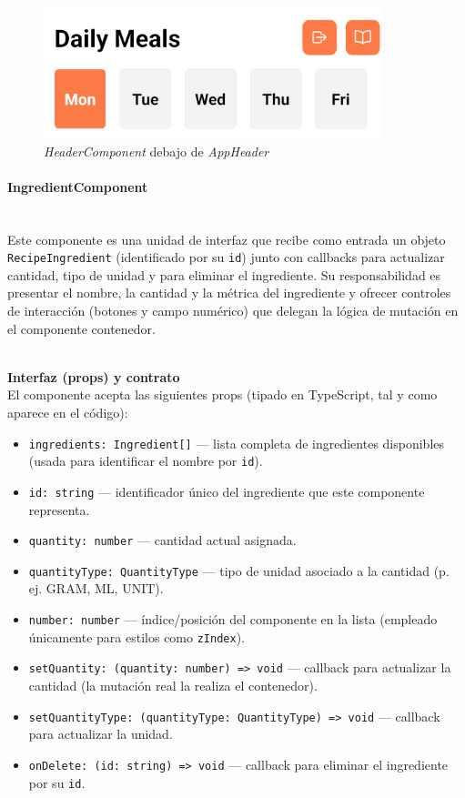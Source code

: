 \documentclass[twoside, openright, 11pt]{report}
\begin{document}
					\begin{figure}[H]
						\centering
						\includegraphics{imagenes/HeaderComponent}
						\caption{\textit{HeaderComponent} debajo de \textit{AppHeader}}
						\label{fig:HeaderComponent}
					\end{figure}
				
				
				\paragraph{IngredientComponent\\\\}
				\label{IngredientComponent}
				
				Este componente es una unidad de interfaz que recibe como entrada un objeto  \texttt{RecipeIngredient} (identificado por su \texttt{id}) junto con callbacks para actualizar cantidad, tipo de unidad y para eliminar el ingrediente. Su responsabilidad es presentar el nombre, la cantidad y la métrica del ingrediente y ofrecer controles de interacción (botones y campo numérico) que delegan la lógica de mutación en el componente contenedor.
				
				\textbf{\\Interfaz (props) y contrato\\}
				El componente acepta las siguientes props (tipado en TypeScript, tal y como aparece en el código):
				\begin{itemize}
					\item \texttt{ingredients: Ingredient[]} — lista completa de ingredientes disponibles (usada para identificar el nombre por \texttt{id}).
					\item \texttt{id: string} — identificador único del ingrediente que este componente representa.
					\item \texttt{quantity: number} — cantidad actual asignada.
					\item \texttt{quantityType: QuantityType} — tipo de unidad asociado a la cantidad (p. ej. GRAM, ML, UNIT).
					\item \texttt{number: number} — índice/posición del componente en la lista (empleado únicamente para estilos como \texttt{zIndex}).
					\item \texttt{setQuantity: (quantity: number) => void} — callback para actualizar la cantidad (la mutación real la realiza el contenedor).
					\item \texttt{setQuantityType: (quantityType: QuantityType) => void} — callback para actualizar la unidad.
					\item \texttt{onDelete: (id: string) => void} — callback para eliminar el ingrediente por su \texttt{id}.
				\end{itemize}
				
\end{document}
